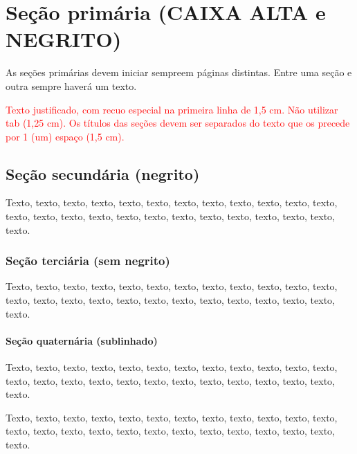 \chapter{Seção primária (CAIXA ALTA e NEGRITO)}

As seções primárias devem iniciar sempreem páginas distintas. Entre uma seção e outra sempre haverá um texto.

\textcolor{red}{Texto justificado, com recuo especial na primeira linha de 1,5 cm. Não utilizar tab (1,25 cm). Os títulos das seções devem ser separados do texto que os precede por 1 (um) espaço (1,5 cm).}



\section{Seção secundária (negrito)}
Texto, texto, texto, texto, texto, texto, texto, texto, texto, texto, texto, texto, texto, texto, texto, texto, texto, texto, texto, texto, texto, texto, texto, texto, texto.


\subsection{Seção terciária (sem negrito)}

Texto, texto, texto, texto, texto, texto, texto, texto, texto, texto, texto, texto, texto, texto, texto, texto, texto, texto, texto, texto, texto, texto, texto, texto, texto.



 
\subsubsection{Seção quaternária (sublinhado)}
Texto, texto, texto, texto, texto, texto, texto, texto, texto, texto, texto, texto, texto, texto, texto, texto, texto, texto, texto, texto, texto, texto, texto, texto, texto.


Texto, texto, texto, texto, texto, texto, texto, texto, texto, texto, texto, texto, texto, texto, texto, texto, texto, texto, texto, texto, texto, texto, texto, texto, texto.





